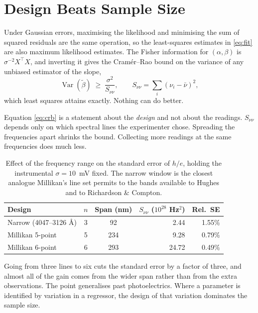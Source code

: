 \documentclass[11pt]{article}
\begin{document}
\section{Design Beats Sample Size}
\label{sec:design}

Under Gaussian errors, maximising the likelihood and minimising the sum of
squared residuals are the same operation, so the least-squares estimates in
\eqref{eq:fit} are also maximum likelihood estimates.  The Fisher information
for $(\alpha,\beta)$ is $\sigma^{-2}X^\top X$, and inverting it gives the
Cram\'er--Rao bound on the variance of any unbiased estimator of the slope,
\begin{equation}\label{eq:crb}
  \operatorname{Var}(\tilde\beta) \;\geq\; \frac{\sigma^2}{S_{\nu\nu}},
  \qquad S_{\nu\nu} = \sum_i (\nu_i - \bar\nu)^2 ,
\end{equation}
which least squares attains exactly.  Nothing can do better.

Equation \eqref{eq:crb} is a statement about the \emph{design} and not about
the readings.  $S_{\nu\nu}$ depends only on which spectral lines the
experimenter chose.  Spreading the frequencies apart shrinks the bound.
Collecting more readings at the same frequencies does much less.

\begin{table}[ht]
\centering
\caption{Effect of the frequency range on the standard error of $h/e$, holding
the instrumental $\sigma = 10$~mV fixed.  The narrow window is the closest
analogue Millikan's line set permits to the bands available to Hughes and to
Richardson \& Compton.}
\label{tab:design}
\medskip
\begin{tabular}{lccrr}
\toprule
Design & $n$ & Span (nm) & $S_{\nu\nu}$ ($10^{28}$ Hz$^2$) & Rel.\ SE \\
\midrule
Narrow (4047--3126 \AA)        & 3 & 92  & 2.44  & 1.55\% \\
Millikan 5-point               & 5 & 234 & 9.28  & 0.79\% \\
Millikan 6-point               & 6 & 293 & 24.72 & 0.49\% \\
\bottomrule
\end{tabular}
\end{table}

Going from three lines to six cuts the standard error by a factor of three,
and almost all of the gain comes from the wider span rather than from the
extra observations.  The point generalises past photoelectrics.  Where a parameter
is identified by variation in a regressor, the design of that variation
dominates the sample size.
\end{document}
